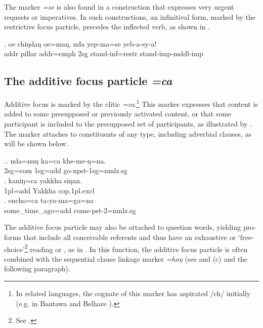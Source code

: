  The marker \emph{=se} is also found in a construction that expresses very urgent requests or imperatives. In such constructions, an infinitival form, marked by the restrictive focus particle, precedes the inflected verb, as shown in \Next.

 \exg. oe     chiŋdaŋ            oe=maŋ,       nda yep-ma=se               yeb-a-sy-a!\\
 {\sc addr} pillar {\sc addr=emph} {\sc 2sg} stand{\sc -inf=restr} stand{\sc -imp-mddl-imp}\\
  
 
 
\subsection{The additive focus particle \emph{=ca}}\label{ptcl-additive}

 Additive focus is marked by the clitic \emph{=ca}.\footnote{In related languages, the cognate of this marker has aspirated /ch/ initially (e.g. in  Bantawa and Belhare \citealt{Doornenbal2009A-grammar, Bickel2003Belhare}).} This marker expresses that content is added to some presupposed or previously activated  content, or that some participant is included to the presupposed set of participants, as illustrated by \Next. The marker attaches  to constituents of any type, including adverbial clauses, as will be shown below. 
 
 \ex.\ag. nda=nuŋ ka=ca khe-me-ŋ=na.\\
 {\sc 2sg=com}  {\sc 1sg=add}  go{\sc -npst-1sg=nmlz.sg}\\
 \bg.             kaniŋ=ca        yakkha          siŋan.\\
 {\sc 1pl=add} Yakkha {\sc cop.1pl.excl}\\
  
\bg.  encho=ca                ta-ya-ma=ga=na\\
some\_time\_ago{\sc =add} come{\sc -pst-2=nmlz.sg}\\
 
 
The additive focus particle  may also  be attached to question words,  yielding pro-forms that include all conceivable referents and thus have an exhaustive or ‘free-choice’\footnote{See \citet[980]{Koenig1993_Focus}.}  reading  or ,  as in \Next. In this function, the additive focus particle is often combined with the sequential clause linkage marker \emph{=hoŋ} (see \Next[b] and (c) and the following paragraph). 

